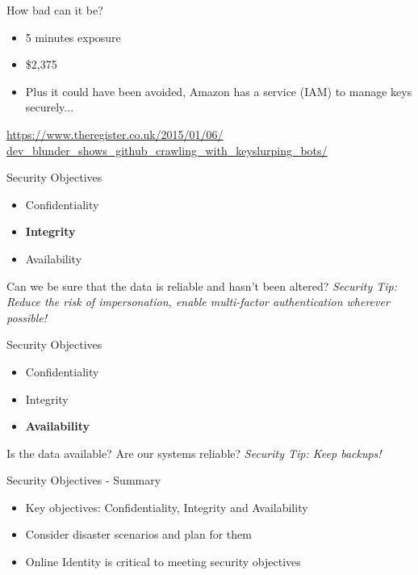 \documentclass[aspectratio=169]{beamer}
\begin{document}
\begin{frame}{How bad can it be?}
\begin{itemize}
\item 5 minutes exposure
\item \$2,375
\item Plus it could have been avoided, Amazon has a service (IAM) to manage keys securely...
\end{itemize}
{\small \url{https://www.theregister.co.uk/2015/01/06/ dev_blunder_shows_github_crawling_with_keyslurping_bots/} \par}
\end{frame}

\begin{frame}{Security Objectives}
	\begin{itemize}
		\item Confidentiality
		\item \textbf{Integrity}
        \item Availability
	\end{itemize}
    Can we be sure that the data is reliable and hasn't been altered?
	\linebreak
    \linebreak
    { \color{red} \textit{Security Tip: Reduce the risk of impersonation, enable multi-factor authentication wherever possible!} }
\end{frame}


\begin{frame}{Security Objectives}
	\begin{itemize}
		\item Confidentiality
		\item Integrity
        \item \textbf{Availability}
	\end{itemize}
    Is the data available? Are our systems reliable?
	\linebreak
    \linebreak
    { \color{red} \textit{Security Tip: Keep backups!} }
\end{frame}


\begin{frame}{Security Objectives - Summary}
\begin{itemize}
\item Key objectives: Confidentiality, Integrity and Availability
\item Consider disaster scenarios and plan for them 
\item Online Identity is critical to meeting security objectives
\end{itemize}
\end{frame}
\end{document}
